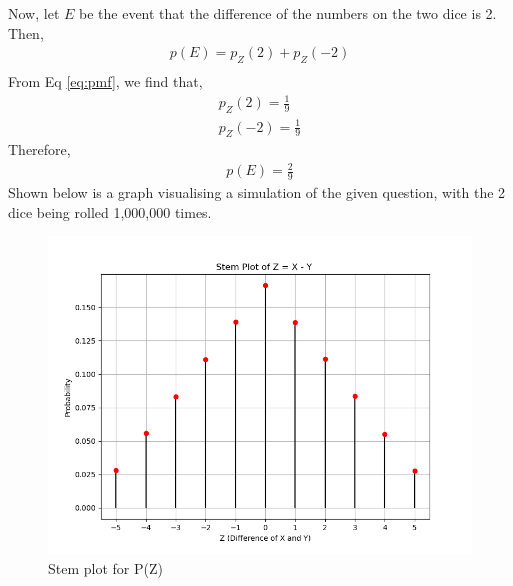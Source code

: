 \documentclass[]{article}
\begin{document}
Now, let $E$ be the event that the difference of the numbers on the two dice is 2. Then,
\begin{align}
  p(E) = p_Z(2) +p_Z(-2)\\
\end{align}
From Eq \eqref{eq:pmf}, we find that,
\begin{align}
  p_Z(2) = \frac{1}{9} \\
  p_Z(-2) = \frac{1}{9}
\end{align}
Therefore,
\begin{align}
  p(E)=\frac{2}{9}
\end{align}
Shown below is a graph visualising a simulation of the given question, with the 2 dice being rolled 1,000,000 times.
\begin{figure}
  \includegraphics[width=\columnwidth]{./figs/Z.png}
  \caption{Stem plot for P(Z)}
  \label{fig:exemplar/10/13/3/1/Z/}
\end{figure}
\end{document}
